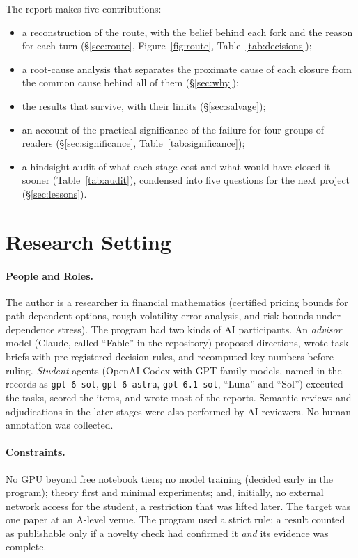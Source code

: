 \documentclass[11pt]{article}
\begin{document}
The report makes five contributions:
\begin{itemize}
\item a reconstruction of the route, with the belief behind each fork and the reason for each turn (\S\ref{sec:route}, Figure~\ref{fig:route}, Table~\ref{tab:decisions});
\item a root-cause analysis that separates the proximate cause of each closure from the common cause behind all of them (\S\ref{sec:why});
\item the results that survive, with their limits (\S\ref{sec:salvage});
\item an account of the practical significance of the failure for four groups of readers (\S\ref{sec:significance}, Table~\ref{tab:significance});
\item a hindsight audit of what each stage cost and what would have closed it sooner (Table~\ref{tab:audit}), condensed into five questions for the next project (\S\ref{sec:lessons}).
\end{itemize}

\section{Research Setting}
\label{sec:setting}

\paragraph{People and Roles.} The author is a researcher in financial mathematics (certified pricing bounds for path-dependent options, rough-volatility error analysis, and risk bounds under dependence stress). The program had two kinds of AI participants. An \emph{advisor} model (Claude, called ``Fable'' in the repository) proposed directions, wrote task briefs with pre-registered decision rules, and recomputed key numbers before ruling. \emph{Student} agents (OpenAI Codex with GPT-family models, named in the records as \texttt{gpt-6-sol}, \texttt{gpt-6-astra}, \texttt{gpt-6.1-sol}, ``Luna'' and ``Sol'') executed the tasks, scored the items, and wrote most of the reports. Semantic reviews and adjudications in the later stages were also performed by AI reviewers. No human annotation was collected.

\paragraph{Constraints.} No GPU beyond free notebook tiers; no model training (decided early in the program); theory first and minimal experiments; and, initially, no external network access for the student, a restriction that was lifted later. The target was one paper at an A-level venue. The program used a strict rule: a result counted as publishable only if a novelty check had confirmed it \emph{and} its evidence was complete.
\end{document}
